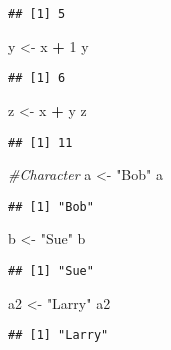 \documentclass[]{article}
\newenvironment{Shaded}{\begin{snugshade}}{\end{snugshade}}
\newcommand{\CommentTok}[1]{\textcolor[rgb]{0.56,0.35,0.01}{\textit{#1}}}
\newcommand{\DecValTok}[1]{\textcolor[rgb]{0.00,0.00,0.81}{#1}}
\newcommand{\NormalTok}[1]{#1}
\newcommand{\OperatorTok}[1]{\textcolor[rgb]{0.81,0.36,0.00}{\textbf{#1}}}
\newcommand{\StringTok}[1]{\textcolor[rgb]{0.31,0.60,0.02}{#1}}
\begin{document}
\begin{verbatim}
## [1] 5
\end{verbatim}

\begin{Shaded}
\begin{Highlighting}[]
\NormalTok{y <-}\StringTok{ }\NormalTok{x }\OperatorTok{+}\StringTok{ }\DecValTok{1}
\NormalTok{y}
\end{Highlighting}
\end{Shaded}

\begin{verbatim}
## [1] 6
\end{verbatim}

\begin{Shaded}
\begin{Highlighting}[]
\NormalTok{z <-}\StringTok{ }\NormalTok{x }\OperatorTok{+}\StringTok{ }\NormalTok{y}
\NormalTok{z}
\end{Highlighting}
\end{Shaded}

\begin{verbatim}
## [1] 11
\end{verbatim}

\begin{Shaded}
\begin{Highlighting}[]
\CommentTok{#Character}
\NormalTok{a <-}\StringTok{ "Bob"}
\NormalTok{a}
\end{Highlighting}
\end{Shaded}

\begin{verbatim}
## [1] "Bob"
\end{verbatim}

\begin{Shaded}
\begin{Highlighting}[]
\NormalTok{b <-}\StringTok{ "Sue"}
\NormalTok{b}
\end{Highlighting}
\end{Shaded}

\begin{verbatim}
## [1] "Sue"
\end{verbatim}

\begin{Shaded}
\begin{Highlighting}[]
\NormalTok{a2 <-}\StringTok{ "Larry"}
\NormalTok{a2}
\end{Highlighting}
\end{Shaded}

\begin{verbatim}
## [1] "Larry"
\end{verbatim}
\end{document}
